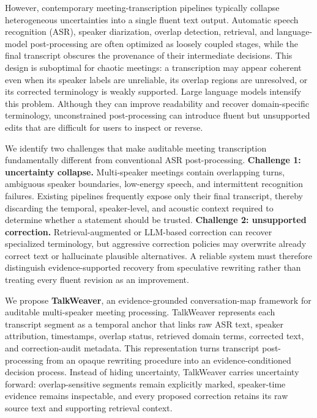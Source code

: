 \documentclass[10pt,twocolumn]{article}
\begin{document}
However, contemporary meeting-transcription pipelines typically collapse heterogeneous uncertainties into a single fluent text output. Automatic speech recognition (ASR), speaker diarization, overlap detection, retrieval, and language-model post-processing are often optimized as loosely coupled stages, while the final transcript obscures the provenance of their intermediate decisions. This design is suboptimal for chaotic meetings: a transcription may appear coherent even when its speaker labels are unreliable, its overlap regions are unresolved, or its corrected terminology is weakly supported. Large language models intensify this problem. Although they can improve readability and recover domain-specific terminology, unconstrained post-processing can introduce fluent but unsupported edits that are difficult for users to inspect or reverse.

We identify two challenges that make auditable meeting transcription fundamentally different from conventional ASR post-processing. \textbf{Challenge 1: uncertainty collapse.} Multi-speaker meetings contain overlapping turns, ambiguous speaker boundaries, low-energy speech, and intermittent recognition failures. Existing pipelines frequently expose only their final transcript, thereby discarding the temporal, speaker-level, and acoustic context required to determine whether a statement should be trusted. \textbf{Challenge 2: unsupported correction.} Retrieval-augmented or LLM-based correction can recover specialized terminology, but aggressive correction policies may overwrite already correct text or hallucinate plausible alternatives. A reliable system must therefore distinguish evidence-supported recovery from speculative rewriting rather than treating every fluent revision as an improvement.

We propose \textbf{TalkWeaver}, an evidence-grounded conversation-map framework for auditable multi-speaker meeting processing. TalkWeaver represents each transcript segment as a temporal anchor that links raw ASR text, speaker attribution, timestamps, overlap status, retrieved domain terms, corrected text, and correction-audit metadata. This representation turns transcript post-processing from an opaque rewriting procedure into an evidence-conditioned decision process. Instead of hiding uncertainty, TalkWeaver carries uncertainty forward: overlap-sensitive segments remain explicitly marked, speaker-time evidence remains inspectable, and every proposed correction retains its raw source text and supporting retrieval context.
\end{document}
